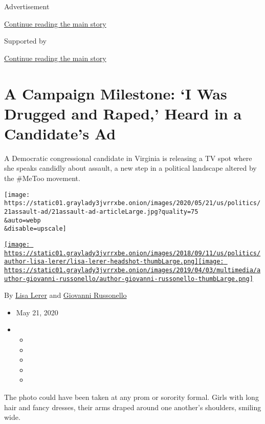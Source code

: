 Advertisement

\protect\hyperlink{after-top}{Continue reading the main story}

Supported by

\protect\hyperlink{after-sponsor}{Continue reading the main story}

\hypertarget{a-campaign-milestone-i-was-drugged-and-raped-heard-in-a-candidates-ad}{%
\section{A Campaign Milestone: `I Was Drugged and Raped,' Heard in a
Candidate's
Ad}\label{a-campaign-milestone-i-was-drugged-and-raped-heard-in-a-candidates-ad}}

A Democratic congressional candidate in Virginia is releasing a TV spot
where she speaks candidly about assault, a new step in a political
landscape altered by the \#MeToo movement.

\texttt{[image: https://static01.graylady3jvrrxbe.onion/images/2020/05/21/us/politics/21assault-ad/21assault-ad-articleLarge.jpg?quality=75\\\&auto=webp\\\&disable=upscale]}

\href{https://www.nytimes3xbfgragh.onion/by/lisa-lerer}{\texttt{[image: https://static01.graylady3jvrrxbe.onion/images/2018/09/11/us/politics/author-lisa-lerer/lisa-lerer-headshot-thumbLarge.png]}}\href{https://www.nytimes3xbfgragh.onion/by/giovanni-russonello}{\texttt{[image: https://static01.graylady3jvrrxbe.onion/images/2019/04/03/multimedia/author-giovanni-russonello/author-giovanni-russonello-thumbLarge.png]}}

By \href{https://www.nytimes3xbfgragh.onion/by/lisa-lerer}{Lisa Lerer}
and
\href{https://www.nytimes3xbfgragh.onion/by/giovanni-russonello}{Giovanni
Russonello}

\begin{itemize}
\item
  May 21, 2020
\item
  \begin{itemize}
  \item
  \item
  \item
  \item
  \item
  \end{itemize}
\end{itemize}

The photo could have been taken at any prom or sorority formal. Girls
with long hair and fancy dresses, their arms draped around one another's
shoulders, smiling wide.

